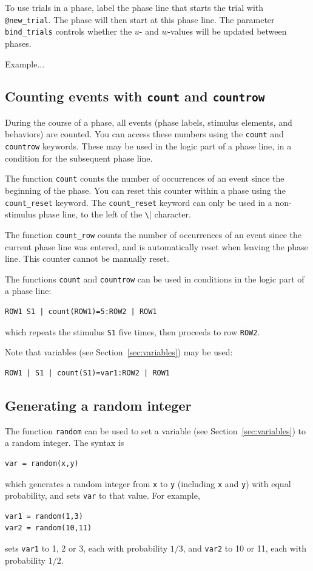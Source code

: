 \documentclass[11pt]{article}
\newcommand{\scr}[1]{\lstinline|#1|}
\begin{document}
To use trials in a phase, label the phase line that starts the trial with \scr{@new_trial}. The phase will then start at this phase line. The parameter \scr{bind_trials} controls whether the $u$- and $w$-values will be updated between phases.

Example...

\subsection{Counting events with \scr{count} and \scr{countrow}}
During the course of a phase, all events (phase labels, stimulus elements, and behaviors) are counted. You can access these numbers using the \scr{count} and \scr{countrow} keywords. These may be used in the logic part of a phase line, in a condition for the subsequent phase line.

The function \scr{count} counts the number of occurrences of an event since the beginning of the phase. You can reset this counter within a phase using the \scr{count_reset} keyword. The \scr{count_reset} keyword can only be used in a non-stimulus phase line, to the left of the \scr{\|} character.

The function \scr{count_row} counts the number of occurrences of an event since the current phase line was entered, and is automatically reset when leaving the phase line. This counter cannot be manually reset.

The functions \scr{count} and \scr{countrow} can be used in conditions in the logic part of a phase line:
\begin{verbatim}
ROW1 S1 | count(ROW1)=5:ROW2 | ROW1
\end{verbatim}
which repeats the stimulus \scr{S1} five times, then proceeds to row \scr{ROW2}.

Note that variables (see Section~\ref{sec:variables}) may be used:
\begin{verbatim}
ROW1 | S1 | count(S1)=var1:ROW2 | ROW1
\end{verbatim}

\subsection{Generating a random integer}
The function \scr{random} can be used to set a variable (see Section~\ref{sec:variables}) to a random integer. The syntax is
\begin{verbatim}
var = random(x,y)
\end{verbatim}
which generates a random integer from \scr{x} to \scr{y} (including \scr{x} and \scr{y}) with equal probability, and sets \scr{var} to that value. For example,
\begin{verbatim}
var1 = random(1,3)
var2 = random(10,11)
\end{verbatim}
sets \scr{var1} to 1, 2 or 3, each with probability $1/3$, and
\scr{var2} to 10 or 11, each with probability $1/2$.
\end{document}
